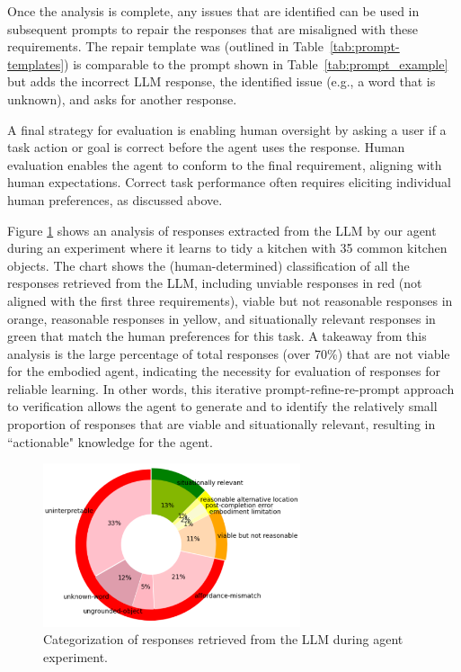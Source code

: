 \documentclass[letterpaper]{article} %
\begin{document}
Once the analysis is complete, any issues that are identified can be used in subsequent prompts to repair the responses that are misaligned with these requirements. The repair template was (outlined in Table~\ref{tab:prompt-templates}) is comparable to the prompt shown in Table~\ref{tab:prompt_example} but adds the incorrect LLM response, the identified issue (e.g., a word that is unknown), and asks for another response.

A final strategy for evaluation is enabling human oversight by asking a user if a task action or goal is correct before the agent uses the response. Human evaluation enables the agent to conform to the final requirement, aligning with human expectations. Correct task performance often requires eliciting individual human preferences, as discussed above.

Figure \ref{fig:response_categories} shows an analysis of responses extracted from the LLM by our agent during an experiment where it learns to tidy a kitchen with 35 common kitchen objects. The chart shows the (human-determined) classification of all the responses retrieved from the LLM, including unviable responses in red (not aligned with the first three requirements), viable but not reasonable responses in orange, reasonable responses in yellow, and situationally relevant responses in green that match the human preferences for this task. A takeaway from this analysis is the large percentage of total responses (over 70\%) that are not viable for the embodied agent, indicating the necessity for evaluation of responses for reliable learning. In other words, this iterative prompt-refine-re-prompt approach to verification allows the agent to generate and to identify the relatively small proportion of responses that are viable and situationally relevant, resulting in ``actionable" knowledge for the agent.

\begin{figure}[t]
\centering
\includegraphics[width=0.9\columnwidth,height=1.89in ]{figures/VerificationTypicalObjectsStandAloneResponseCategoriesSTARSManualCrop.png}
\caption{Categorization of responses retrieved from the LLM during agent experiment.}
\label{fig:response_categories}
\end{figure}
\end{document}
